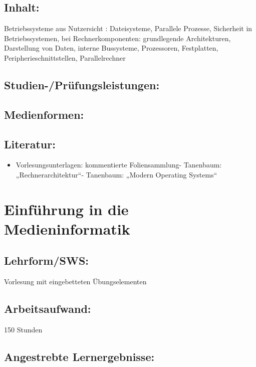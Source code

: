 \section{Inhalt:}\label{inhalt-8}

Betriebssysteme aus Nutzersicht : Dateisysteme, Parallele Prozesse,
Sicherheit in Betriebssystemen, bei Rechnerkomponenten: grundlegende
Architekturen, Darstellung von Daten, interne Bussysteme, Prozessoren,
Festplatten, Peripherieschnittstellen, Parallelrechner

\section{Studien-/Prüfungsleistungen:}\label{studien-pruxfcfungsleistungen-8}

\section{Medienformen:}\label{medienformen-8}

\section{Literatur:}\label{literatur-8}

\begin{itemize}
\tightlist
\item
  Vorlesungsunterlagen: kommentierte Foliensammlung- Tanenbaum:
  „Rechnerarchitektur``- Tanenbaum: „Modern Operating Systems``
\end{itemize}

\chapter{Einführung in die
Medieninformatik}\label{einfuxfchrung-in-die-medieninformatik}

\section{Lehrform/SWS:}\label{lehrformsws-9}

Vorlesung mit eingebetteten Übungselementen

\section{Arbeitsaufwand:}\label{arbeitsaufwand-9}

150 Stunden

\section{Angestrebte
Lernergebnisse:}\label{angestrebte-lernergebnisse-9}

